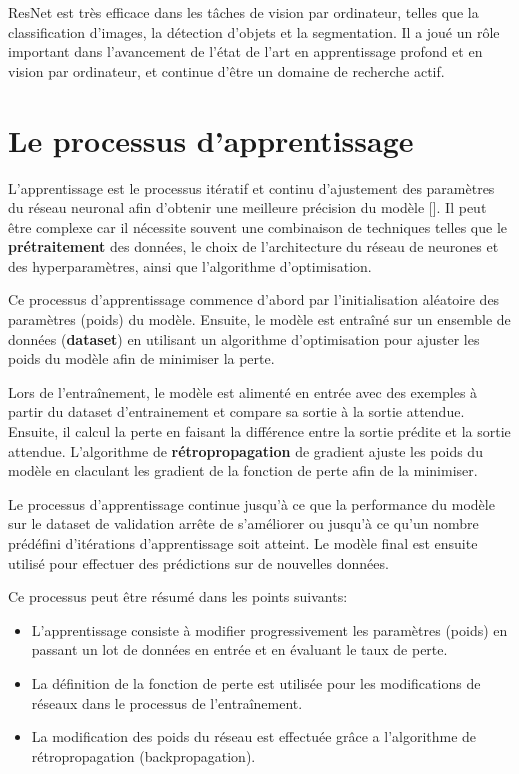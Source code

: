 \medskip
ResNet est très efficace dans les tâches de vision par ordinateur, telles que la classification d'images, la détection d'objets et la segmentation. Il a joué un rôle important dans l'avancement de l'état de l'art en apprentissage profond et en vision par ordinateur, et continue d'être un domaine de recherche actif.

\section{Le processus d’apprentissage}
L’apprentissage est le processus itératif et continu d’ajustement des
paramètres du réseau neuronal afin d’obtenir une meilleure précision du modèle
[\cite{Goodfellow-et-al-2016}]. Il peut être complexe car il nécessite souvent
une combinaison de techniques telles que le \textbf{prétraitement} des données,
le choix de l'architecture du réseau de neurones et des hyperparamètres, ainsi
que l'algorithme d'optimisation.

Ce processus d'apprentissage commence d'abord par l'initialisation aléatoire
des paramètres (poids) du modèle. Ensuite, le modèle est entraîné sur un
ensemble de données (\textbf{dataset}) en utilisant un algorithme
d'optimisation pour ajuster les poids du modèle afin de minimiser la perte.

Lors de l'entraînement, le modèle est alimenté en entrée avec des exemples à
partir du dataset d'entrainement et compare sa sortie à la sortie attendue.
Ensuite, il calcul la perte en faisant la différence entre la sortie prédite et
la sortie attendue. L'algorithme de \textbf{rétropropagation} de gradient
ajuste les poids du modèle en claculant les gradient de la fonction de perte
afin de la minimiser.

Le processus d'apprentissage continue jusqu'à ce que la performance du modèle
sur le dataset de validation arrête de s'améliorer ou jusqu'à ce qu'un nombre
prédéfini d'itérations d'apprentissage soit atteint. Le modèle final est
ensuite utilisé pour effectuer des prédictions sur de nouvelles données.

\medskip
Ce processus peut être résumé dans les points suivants:
\begin{itemize}
	\item L’apprentissage consiste à modifier progressivement les paramètres (poids) en
	      passant un lot de données en entrée et en évaluant le taux de perte.
	\item La définition de la fonction de perte est utilisée pour les modifications de
	      réseaux dans le processus de l'entraînement.
	\item La modification des poids du réseau est effectuée grâce a l’algorithme de
	      rétropropagation (backpropagation).
\end{itemize}

